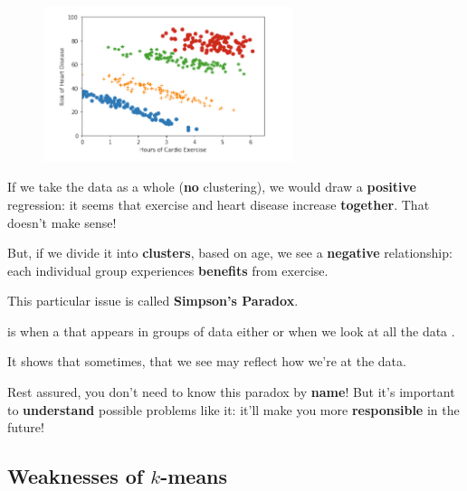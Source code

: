         \begin{figure}[h]
            \centering
            \includegraphics[width=0.65\textwidth]{images/clustering_images/simpsons_problem.png}
        \end{figure}
        
        If we take the data as a whole (\textbf{no} clustering), we would draw a \textbf{positive} regression: it seems that exercise and heart disease increase \textbf{together}. That doesn't make sense!
        
        But, if we divide it into \textbf{clusters}, based on age, we see a \textbf{negative} relationship: each individual group experiences \textbf{benefits} from exercise.
        
        This particular issue is called \textbf{Simpson's Paradox}.\\
        
        \begin{definition}
             is when a  that appears in groups of data either  or  when we look at all the data .
            
            It shows that sometimes,  that we see may reflect how we're  at the data.
        \end{definition}
        
        Rest assured, you don't need to know this paradox by \textbf{name}! But it's important to \textbf{understand} possible problems like it: it'll make you more \textbf{responsible} in the future!
        
    \subsection{Weaknesses of $k$-means}
    
    
